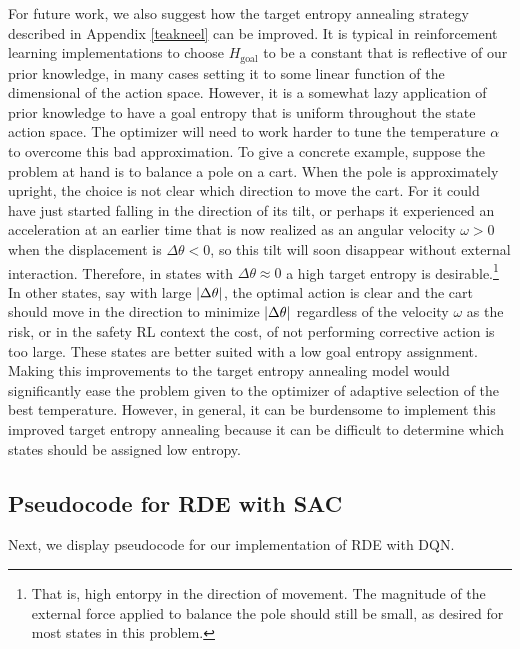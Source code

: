 \documentclass[base]{subfiles}
\begin{document}
For future work, we also suggest how the target entropy annealing strategy described in Appendix \ref{teakneel} can be improved.
It is typical in reinforcement learning implementations to choose \(H_{\text{goal}}\) to be a constant that is reflective of our prior knowledge, in many cases setting it to some linear function of the dimensional of the action space.
However, it is a somewhat lazy application of prior knowledge to have a goal entropy that is uniform throughout the state action space.
The optimizer will need to work harder to tune the temperature \(\alpha\) to overcome this bad approximation.
To give a concrete example, suppose the problem at hand is to balance a pole on a cart.
When the pole is approximately upright, the choice is not clear which direction to move the cart.
For it could have just started falling in the direction of its tilt, or perhaps it experienced an acceleration at an earlier time that is now realized as an angular velocity \(\omega > 0\) when the displacement is \(\Delta \theta < 0\), so this tilt will soon disappear without external interaction.
Therefore, in states with \(\Delta \theta \approx 0\) a high target entropy is desirable.\footnote{That is, high entorpy in the direction of movement. The magnitude of the external force applied to balance the pole should still be small, as desired for most states in this problem.}
In other states, say with large \(\lvert\Delta \theta\rvert\), the optimal action is clear and the cart should move in the direction to minimize \(\lvert\Delta \theta\rvert\) regardless of the velocity \(\omega\) as the risk, or in the safety RL context the cost, of not performing corrective action is too large.
These states are better suited with a low goal entropy assignment.
Making this improvements to the target entropy annealing model would significantly ease the problem given to the optimizer of adaptive selection of the best temperature.
However, in general, it can be burdensome to implement this improved target entropy annealing because it can be difficult to determine which states should be assigned low entropy.

\newpage

\subsection{Pseudocode for RDE with SAC}

Next, we display pseudocode for our implementation of RDE with DQN.
\end{document}
